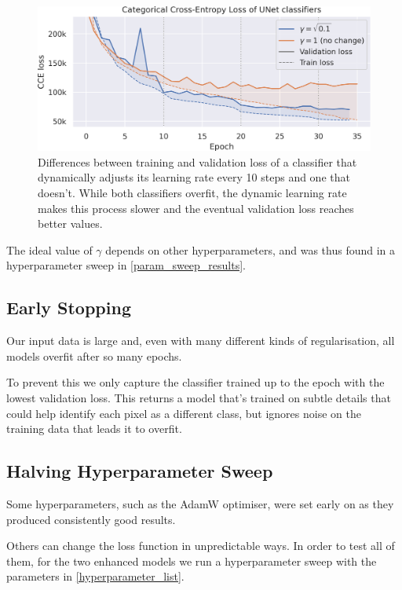 \begin{figure}
	\centering
	\includegraphics[width=.90\textwidth]{gamma_vs_nogamma.png}
	\caption{Differences between training and validation loss of a classifier that dynamically adjusts its learning rate every 10 steps and one that doesn't. While both classifiers overfit, the dynamic learning rate makes this process slower and the eventual validation loss reaches better values.}
	\label{gamma_vs_nogamma}
\end{figure}

The ideal value of $\gamma$ depends on other hyperparameters, and was thus found in a hyperparameter sweep in \cref{param_sweep_results}.

\subsection{Early Stopping}

Our input data is large and, even with many different kinds of regularisation, all models overfit after so many epochs.

To prevent this we only capture the classifier trained up to the epoch with the lowest validation loss.
This returns a model that's trained on subtle details that could help identify each pixel as a different class, but ignores noise on the training data that leads it to overfit.

\subsection{Halving Hyperparameter Sweep}
\label{param_sweep}
Some hyperparameters, such as the AdamW optimiser, were set early on as they produced consistently good results.

Others can change the loss function in unpredictable ways.
In order to test all of them, for the two enhanced models we run a hyperparameter sweep with the parameters in \cref{hyperparameter_list}.

